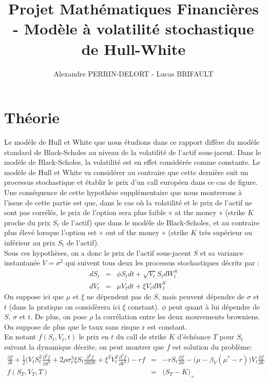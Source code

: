 \documentclass{report}
\title{Projet Mathématiques Financières - Modèle à volatilité stochastique de Hull-White}
\date{}
\author{Alexandre PERRIN-DELORT  -  Lucas BRIFAULT}
\begin{document}
\maketitle
\section*{Théorie}
Le modèle de Hull et White que nous étudions dans ce rapport diffère du modèle standard de Black-Scholes au niveau de la volatilité de l’actif sous-jacent. Dans le modèle de Black-Scholes, la volatilité est en effet considérée comme constante.  Le modèle de Hull et White va considérer au contraire que cette dernière suit un processus stochastique et établir le prix d’un call européen dans ce cas de figure.\\ 
Une conséquence de cette hypothèse supplémentaire que nous montrerons à l’issue de cette partie est que, dans le cas où la volatilité et le prix de l’actif ne sont pas corrélés, le prix de l’option sera plus faible « at the money » (strike $K$ proche du prix $S_t$ de l’actif) que dans le modèle de Black-Scholes, et au contraire plus élevé lorsque l’option est « out of the money » (strike $K$ très supérieur ou inférieur au prix $S_t$ de  l’actif).\\
Sous ces hypothèses, on a donc le prix de l’actif sous-jacent $S$ et sa variance instantanée $V = \sigma^2$ qui suivent tous deux les processus stochastiques décrits par :
\begin{eqnarray*}
dS_t &=& \phi S_t dt + \sqrt{V_t}S_t dW^S_t\\
dV_t &=& \mu V_t dt + \xi V_t dW^V_t
\end{eqnarray*}
On suppose ici que $\mu$ et $\xi$ ne dépendent pas de $S$, mais peuvent dépendre de $\sigma$ et $t$ (dans la pratique on considèrera ici $\xi$ constant). $\phi$ peut quant à lui dépendre de $S$, $\sigma$ et $t$. De plus, on pose $\rho$ la corrélation entre les deux mouvements browniens.  On suppose de plus que le taux sans risque r est constant.\\
En notant $f(S_t, V_t, t)$ le prix en $t$ du call de strike $K$ d'échéance $T$ pour $S_t$ suivant la dynamique décrite, on peut montrer que $f$ est solution du problème:
\begin{eqnarray*}
\frac{\partial f}{\partial t} + \frac{1}{2}\Big(V_t S_t^2 \frac{\partial^2 f}{\partial S^2} + 2\rho \sigma_t^3 \xi S_t\frac{\partial^2 f}{\partial S\partial V} + \xi^2 V_t^2\frac{\partial^2 f}{\partial V^2}\Big) -rf &=& -rS_t\frac{\partial f}{\partial S} - \Big(\mu -\beta_V(\mu^* - r)\Big)V_t\frac{\partial f}{\partial V}\\
f(S_T, V_T, T) &=& \big(S_T - K\big)_+
\end{eqnarray*}
\end{document}
